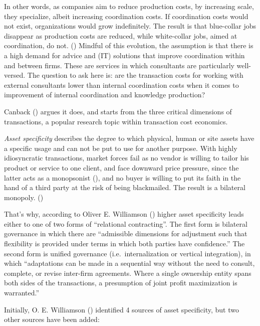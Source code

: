 \documentclass[
  man,floatsintext]{apa6}
\begin{document}
In other words, as companies aim to reduce production costs, by increasing scale, they specialize, albeit increasing coordination costs. If coordination costs would not exist, organizations would grow indefinitely. The result is that blue-collar jobs disappear as production costs are reduced, while white-collar jobs, aimed at coordination, do not. () Mindful of this evolution, the assumption is that there is a high demand for advice and (IT) solutions that improve coordination within and between firms. These are services in which consultants are particularly well-versed. The question to ask here is: are the transaction costs for working with external consultants lower than internal coordination costs when it comes to improvement of internal coordination and knowledge production?

Canback () argues it does, and starts from the three critical dimensions of transactions, a popular research topic within transaction cost economics.

\emph{Asset specificity} describes the degree to which physical, human or site assets have a specific usage and can not be put to use for another purpose. With highly idiosyncratic transactions, market forces fail as no vendor is willing to tailor his product or service to one client, and face downward price pressure, since the latter acts as a monopsonist (), and no buyer is willing to put its faith in the hand of a third party at the risk of being blackmailed. The result is a bilateral monopoly. ()

That's why, according to Oliver E. Williamson () higher asset specificity leads either to one of two forms of ``relational contracting''. The first form is bilateral governance in which there are ``admissible dimensions for adjustment such that flexibility is provided under terms in which both parties have confidence.'' The second form is unified governance (i.e.~internalization or vertical integration), in which ``adaptations can be made in a sequential way without the need to consult, complete, or revise inter-firm agreements. Where a single ownership entity spans both sides of the transactions, a presumption of joint profit maximization is warranted.''

Initially, O. E. Williamson () identified 4 sources of asset specificity, but two other sources have been added:
\end{document}
